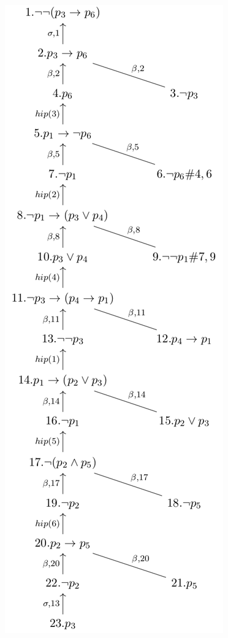 \begin{example}
\begin{center}
\begin{figure}[H]
\includegraphics[scale = 0.70]{figures/tableau2.png}
\end{figure}
\end{center}


\end{example}

